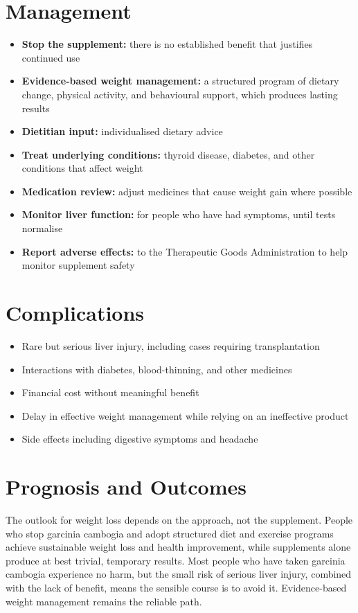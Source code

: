 \section*{Management}
\begin{itemize}
    \item \textbf{Stop the supplement:} there is no established benefit that justifies continued use
    \item \textbf{Evidence-based weight management:} a structured program of dietary change, physical activity, and behavioural support, which produces lasting results
    \item \textbf{Dietitian input:} individualised dietary advice
    \item \textbf{Treat underlying conditions:} thyroid disease, diabetes, and other conditions that affect weight
    \item \textbf{Medication review:} adjust medicines that cause weight gain where possible
    \item \textbf{Monitor liver function:} for people who have had symptoms, until tests normalise
    \item \textbf{Report adverse effects:} to the Therapeutic Goods Administration to help monitor supplement safety
\end{itemize}

\section*{Complications}
\begin{itemize}
    \item Rare but serious liver injury, including cases requiring transplantation
    \item Interactions with diabetes, blood-thinning, and other medicines
    \item Financial cost without meaningful benefit
    \item Delay in effective weight management while relying on an ineffective product
    \item Side effects including digestive symptoms and headache
\end{itemize}

\section*{Prognosis and Outcomes}
The outlook for weight loss depends on the approach, not the supplement. People who stop garcinia cambogia and adopt structured diet and exercise programs achieve sustainable weight loss and health improvement, while supplements alone produce at best trivial, temporary results. Most people who have taken garcinia cambogia experience no harm, but the small risk of serious liver injury, combined with the lack of benefit, means the sensible course is to avoid it. Evidence-based weight management remains the reliable path.

